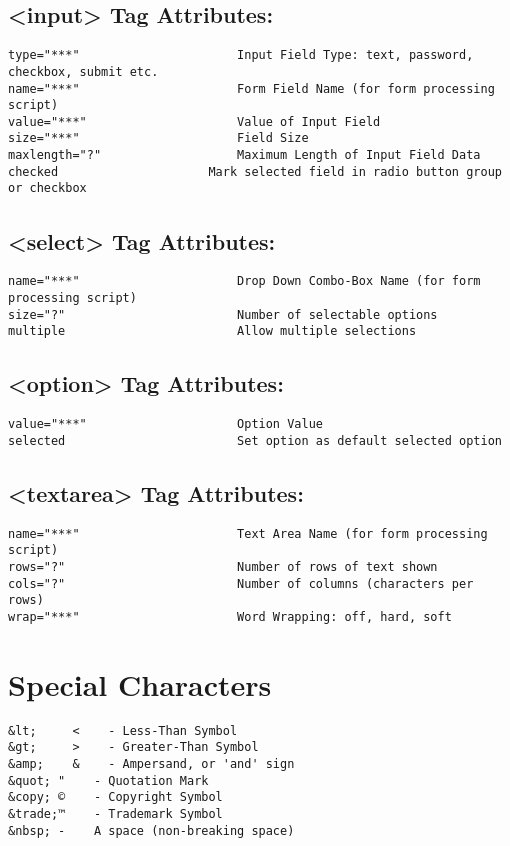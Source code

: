 \documentclass[11pt]{article}
\begin{document}
\subsection*{<input> Tag Attributes:}
\label{sec:org1264b93}
\begin{verbatim}
type="***"		                Input Field Type: text, password, checkbox, submit etc.
name="***"		                Form Field Name (for form processing script)
value="***"		                Value of Input Field
size="***"		                Field Size
maxlength="?"	                Maximum Length of Input Field Data
checked		                Mark selected field in radio button group or checkbox
\end{verbatim}

\subsection*{<select> Tag Attributes:}
\label{sec:orgd341161}
\begin{verbatim}
name="***"		                Drop Down Combo-Box Name (for form processing script)
size="?"		                Number of selectable options
multiple		                Allow multiple selections
\end{verbatim}
\subsection*{<option> Tag Attributes:}
\label{sec:org1728f98}
\begin{verbatim}
value="***"		                Option Value
selected		                Set option as default selected option
\end{verbatim}
\subsection*{<textarea> Tag Attributes:}
\label{sec:org0eaf34d}
\begin{verbatim}
name="***"		                Text Area Name (for form processing script)
rows="?"		                Number of rows of text shown
cols="?"		                Number of columns (characters per rows)
wrap="***"		                Word Wrapping: off, hard, soft
\end{verbatim}
\section*{Special Characters}
\label{sec:orga345037}
\begin{verbatim}
&lt;	 <    - Less-Than Symbol
&gt;	 >    - Greater-Than Symbol
&amp;	 &    - Ampersand, or 'and' sign
&quot; "    - Quotation Mark
&copy; ©    - Copyright Symbol
&trade;™    - Trademark Symbol
&nbsp; -    A space (non-breaking space)
\end{verbatim}
\end{document}
